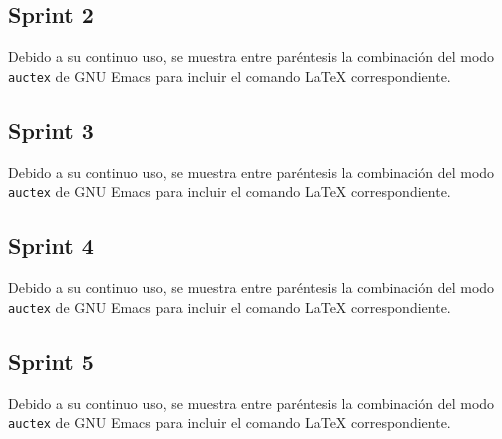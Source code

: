 \subsection{Sprint 2}

Debido a su continuo uso, se muestra entre paréntesis la combinación del modo
\texttt{auctex} de GNU Emacs para incluir el comando \LaTeX{} correspondiente.

\subsection{Sprint 3}

Debido a su continuo uso, se muestra entre paréntesis la combinación del modo
\texttt{auctex} de GNU Emacs para incluir el comando \LaTeX{} correspondiente.

\subsection{Sprint 4}

Debido a su continuo uso, se muestra entre paréntesis la combinación del modo
\texttt{auctex} de GNU Emacs para incluir el comando \LaTeX{} correspondiente.

\subsection{Sprint 5}

Debido a su continuo uso, se muestra entre paréntesis la combinación del modo
\texttt{auctex} de GNU Emacs para incluir el comando \LaTeX{} correspondiente.

